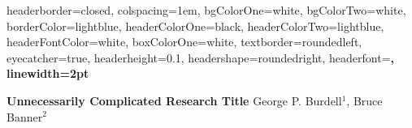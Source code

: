 \documentclass[landscape,a0paper,fontscale=0.285]{baposter}
\begin{document}
\begin{poster}
{
headerborder=closed, %
colspacing=1em, %
bgColorOne=white, %
bgColorTwo=white, %
borderColor=lightblue, %
headerColorOne=black, %
headerColorTwo=lightblue, %
headerFontColor=white, %
boxColorOne=white, %
textborder=roundedleft, %
eyecatcher=true, %
headerheight=0.1\textheight, %
headershape=roundedright, %
headerfont=\Large\bf\textsc, %
linewidth=2pt %
}

{\bf Unnecessarily Complicated Research Title} %
{\vspace{1em} George P. Burdell$^1$, Bruce Banner$^2$ \\
 } %

{}

{}

{}

{}

{}


\end{poster}
\end{document}
